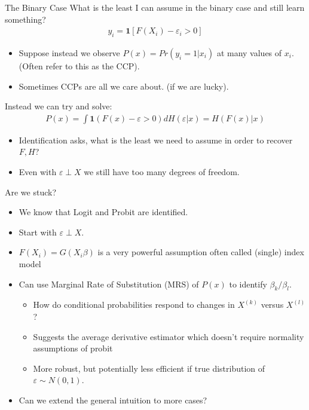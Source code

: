 \begin{frame}{The Binary Case}
What is the least I can assume in the binary case and still learn something?
\begin{eqnarray*}
y_i = \mathbf{1}[F(X_i) - \varepsilon_i > 0]
\end{eqnarray*}
\begin{itemize}
\item Suppose instead we observe $P(x) = Pr(y_i = 1 | x_i)$ at many values of $x_i$. (Often refer to this as the CCP).
\item Sometimes CCPs are all we care about. (if we are lucky).
\end{itemize}
Instead we can try and solve:
\begin{eqnarray*}
P(x) = \int \mathbf{1}(F(x) - \varepsilon > 0) dH(\varepsilon | x) = H(F(x)| x)
\end{eqnarray*}
\begin{itemize}
\item Identification asks, what is the least we need to assume in order to recover $F,H$?
\item Even with $\varepsilon \perp X$ we still have too many degrees of freedom.
\end{itemize}
\end{frame}

\begin{frame}{Are we stuck?}

\begin{itemize}
\item We know that Logit and Probit are identified.
\item Start with $\varepsilon \perp X$.
\item $F(X_i) = G(X_i \beta)$ is a very powerful assumption often called \alert{(single) index model}
\item Can use Marginal Rate of Substitution (MRS) of $P(x)$ to identify $\beta_k / \beta_l$.
\begin{itemize}
\item How do conditional probabilities respond to changes in $X^{(k)}$ versus $X^{(l)}$?
\item Suggests the \alert{average derivative estimator} which doesn't require normality assumptions of probit
\item More robust, but potentially less efficient if true distribution of $\varepsilon \sim N(0,1)$.
\end{itemize}
\item Can we extend the general intuition to more cases?
\end{itemize}
\end{frame}


